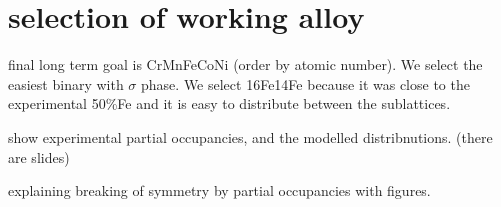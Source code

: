 \documentclass[superscriptaddress, 12pt]{revtex4-2}%
\begin{document}
\section{selection of working alloy}
final long term goal is CrMnFeCoNi (order by atomic number). We select the easiest binary with $\sigma$ phase. 
We select 16Fe14Fe because it was close to the experimental 50\%Fe and it is 
easy to distribute between the sublattices. 

show experimental partial occupancies, and the modelled distribnutions.
(there are slides)

explaining breaking of symmetry by partial occupancies with figures.


 
\end{document}
